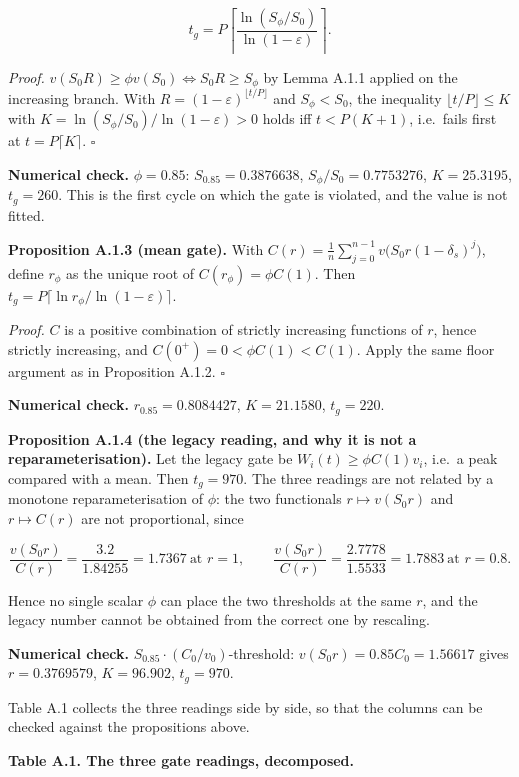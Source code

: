 \documentclass[11pt,a4paper]{article}
\begin{document}
\[
t_g=P\left\lceil\frac{\ln(S_\phi/S_0)}{\ln(1-\varepsilon)}\right\rceil .
\]

\emph{Proof.} \(v(S_0R)\ge\phi v(S_0)\iff S_0R\ge S_\phi\) by Lemma A.1.1 applied on the
increasing branch. With \(R=(1-\varepsilon)^{\lfloor t/P\rfloor}\) and
\(S_\phi<S_0\), the inequality \(\lfloor t/P\rfloor\le K\) with
\(K=\ln(S_\phi/S_0)/\ln(1-\varepsilon)>0\) holds iff \(t<P(K+1)\), i.e.~fails first at
\(t=P\lceil K\rceil\). \(\square\)

\textbf{Numerical check.} \(\phi=0.85\): \(S_{0.85}=0.3876638\), \(S_\phi/S_0=0.7753276\),
\(K=25.3195\), \(t_g=260\). This is the first cycle on which the gate is violated, and
the value is not fitted.

\textbf{Proposition A.1.3 (mean gate).} With \(C(r)=\frac1n\sum_{j=0}^{n-1}
v\big(S_0r(1-\delta_s)^j\big)\), define \(r_\phi\) as the unique root of
\(C(r_\phi)=\phi C(1)\). Then \(t_g=P\lceil\ln r_\phi/\ln(1-\varepsilon)\rceil\).

\emph{Proof.} \(C\) is a positive combination of strictly increasing functions of \(r\),
hence strictly increasing, and \(C(0^+)=0<\phi C(1)<C(1)\). Apply the same
floor argument as in Proposition A.1.2. \(\square\)

\textbf{Numerical check.} \(r_{0.85}=0.8084427\), \(K=21.1580\), \(t_g=220\).

\textbf{Proposition A.1.4 (the legacy reading, and why it is not a reparameterisation).}
Let the legacy gate be \(W_i(t)\ge\phi C(1)v_i\), i.e.~a peak compared with a mean.
Then \(t_g=970\). The three readings are not related by a monotone reparameterisation
of \(\phi\): the two functionals \(r\mapsto v(S_0r)\) and \(r\mapsto C(r)\) are not
proportional, since

\[
\frac{v(S_0r)}{C(r)}=\frac{3.2}{1.84255}=1.7367\ \text{at } r=1,
\qquad
\frac{v(S_0r)}{C(r)}=\frac{2.7778}{1.5533}=1.7883\ \text{at } r=0.8 .
\]

Hence no single scalar \(\phi\) can place the two thresholds at the same \(r\), and
the legacy number cannot be obtained from the correct one by rescaling.

\textbf{Numerical check.} \(S_{0.85}\cdot(C_0/v_0)\)-threshold: \(v(S_0r)=0.85C_0=1.56617\)
gives \(r=0.3769579\), \(K=96.902\), \(t_g=970\).

Table A.1 collects the three readings side by side, so that the columns can be
checked against the propositions above.

\textbf{Table A.1. The three gate readings, decomposed.}
\end{document}
